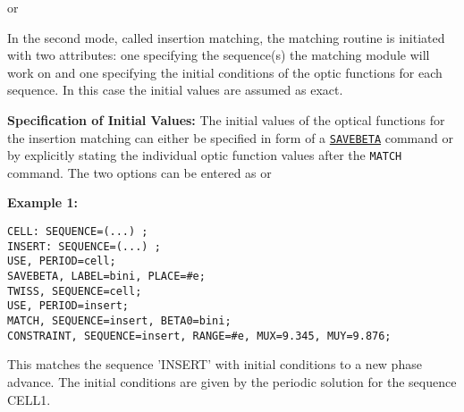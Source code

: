 
or


In the second mode, called insertion matching, the matching routine is
initiated with two attributes: one specifying the sequence(s) the
matching module will work on and one specifying the initial conditions
of the optic functions for each sequence. In this case the initial
values are assumed as exact. 
    
\textbf{Specification of Initial Values:}
The initial values of the optical
functions  for the insertion matching can either be specified in form of
a \hyperref[sec:savebeta]{\texttt{SAVEBETA}} command or by
explicitly stating the individual optic function values after the
\texttt{MATCH} command. The two options can be entered as         
or

\textbf{Example 1:}   
\begin{verbatim}
CELL: SEQUENCE=(...) ;
INSERT: SEQUENCE=(...) ;
USE, PERIOD=cell;
SAVEBETA, LABEL=bini, PLACE=#e;
TWISS, SEQUENCE=cell;
USE, PERIOD=insert;
MATCH, SEQUENCE=insert, BETA0=bini;
CONSTRAINT, SEQUENCE=insert, RANGE=#e, MUX=9.345, MUY=9.876;
\end{verbatim}

This matches the sequence 'INSERT' with initial conditions to a new
phase advance. The initial conditions are given by the periodic solution
for the sequence CELL1. 
    

